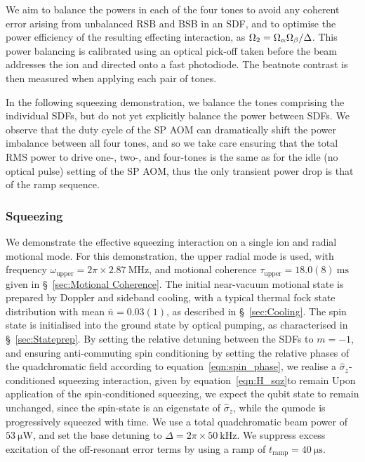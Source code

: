     We aim to balance the powers in each of the four tones
    to avoid any coherent error arising from unbalanced RSB and BSB in an SDF, and to optimise the power efficiency of the resulting effecting interaction, as 
    $\Omega_{\rm 2} = \Omega_\alpha\Omega_\beta/\Delta$.
    This power balancing is calibrated using an optical pick-off taken before the beam addresses the ion and directed onto a fast photodiode. The beatnote contrast is then measured when applying each pair of tones.
    
    In the following squeezing demonstration, we balance the tones
    comprising the individual SDFs, but do not yet explicitly balance the power
    between SDFs. We observe that the duty cycle of the SP AOM can dramatically shift the
    power imbalance between all four tones, and so we take care ensuring that
    the total RMS power to drive one-, two-, and four-tones is the same as for
    the idle (no optical pulse) setting of the SP AOM, thus the only transient
    power drop is that of the ramp sequence. 

    

\subsubsection{Squeezing}


    We demonstrate the effective squeezing interaction on a single ion and radial
    motional mode. For this demonstration, the upper radial mode is used, with frequency
    $\omega_\mathrm{upper}=2\pi\times 2.87~\unit{\mega\hertz}$, and motional coherence $\tau_\mathrm{upper}=18.0(8)~\unit{\milli\second}$ 
    given in
    \S~\ref{sec:Motional Coherence}.
    The initial near-vacuum motional state is prepared by Doppler and sideband
    cooling, with a typical thermal fock state distribution with mean $\bar{n} =
    0.03(1)$, as described in \S~\ref{sec:Cooling}. The spin state is
    initialised into the ground state by optical pumping, as characterised in
    \S~\ref{sec:Stateprep}.
    By setting the relative detuning between the SDFs to $m=-1$, and ensuring
    anti-commuting spin conditioning by setting the relative phases of the
    quadchromatic field according to equation~\ref{eqn:spin_phase}, we realise a
    $\hat\sigma_z$-conditioned squeezing interaction, given by
    equation~\ref{eqn:H_sqz}to remain
    Upon application of the spin-conditioned squeezing, we expect the qubit state to remain unchanged, since the spin-state is an eigenstate of $\hat\sigma_z$, while 
    the qumode is progressively squeezed with time.
    We use a total quadchromatic beam power of $53~\unit{\micro\watt}$, and set the base detuning to $\Delta=2\pi\times 50~\unit{\kilo\hertz}$. We suppress excess excitation of the off-resonant error terms by using a ramp of $t_\mathrm{ramp}=40~\unit{\micro\second}$.

